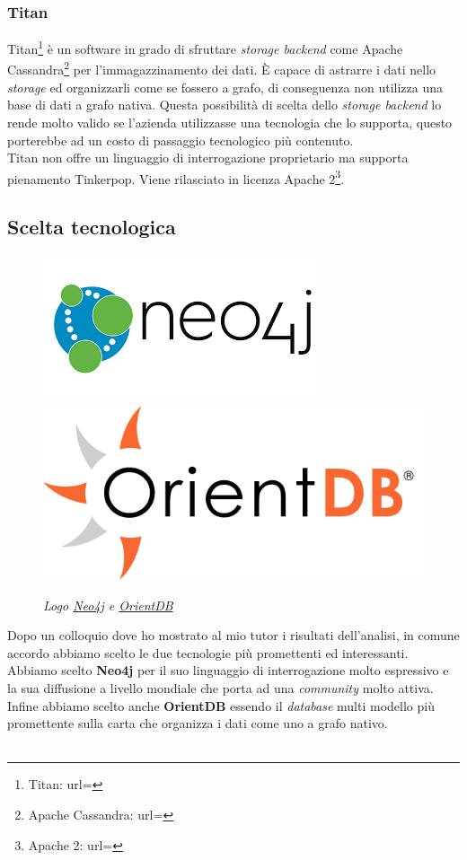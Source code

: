 \subsubsection{Titan}
Titan\footnote{Titan: url= } è un software in grado di sfruttare \textit{storage backend} come Apache Cassandra\footnote{Apache Cassandra: url= } per l'immagazzinamento dei dati. È capace di astrarre i dati nello \textit{storage} ed organizzarli come se fossero a grafo, di conseguenza non utilizza una base di dati a grafo nativa.
Questa possibilità di scelta dello \textit{storage backend} lo rende molto valido se l'azienda utilizzasse una tecnologia che lo supporta, questo porterebbe ad un costo di passaggio tecnologico più contenuto.\\
Titan non offre un linguaggio di interrogazione proprietario ma supporta pienamento Tinkerpop.  Viene rilasciato in licenza Apache 2\footnote{Apache 2: url= }.
\subsection{Scelta tecnologica}
\begin{figure}[h!]
	\centering
	\includegraphics[scale=0.45]{immagini/neo4j.png}
	\includegraphics[scale=0.3]{immagini/orientdb.png}
	\caption{\textit{Logo \href{https://neo4j.com/}{Neo4j} e \href{http://orientdb.com/orientdb/}{OrientDB}}}
\end{figure}
Dopo un colloquio dove ho mostrato al mio tutor i risultati dell'analisi, in comune accordo abbiamo scelto le due tecnologie più promettenti ed interessanti.\\
Abbiamo scelto \textbf{Neo4j} per il suo linguaggio di interrogazione molto espressivo e la sua diffusione a livello mondiale che porta ad una \textit{community} molto attiva.\\
Infine abbiamo scelto anche \textbf{OrientDB} essendo il \textit{database} multi modello più promettente sulla carta che organizza i dati come uno a grafo nativo.
\\
\\

